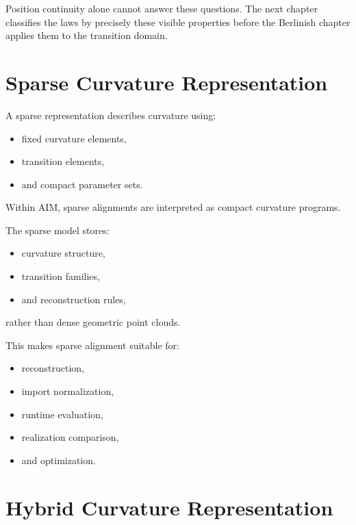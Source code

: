 Position continuity alone cannot answer these questions. The next chapter
classifies the laws by precisely these visible properties before the
Berlinish chapter applies them to the transition domain.

\section{Sparse Curvature Representation}

\begin{definition}
\label{def:sparse-curvature-representation}
A sparse representation describes curvature using:
\begin{itemize}
\item fixed curvature elements,
\item transition elements,
\item and compact parameter sets.
\end{itemize}
\end{definition}

Within AIM, sparse alignments are interpreted as compact curvature
programs.

The sparse model stores:
\begin{itemize}
\item curvature structure,
\item transition families,
\item and reconstruction rules,
\end{itemize}
rather than dense geometric point clouds.

This makes sparse alignment suitable for:
\begin{itemize}
\item reconstruction,
\item import normalization,
\item runtime evaluation,
\item realization comparison,
\item and optimization.
\end{itemize}

\section{Hybrid Curvature Representation}

